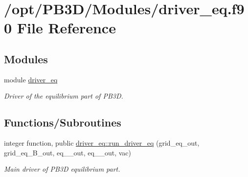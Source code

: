 \hypertarget{driver__eq_8f90}{}\section{/opt/\+P\+B3\+D/\+Modules/driver\+\_\+eq.f90 File Reference}
\label{driver__eq_8f90}
\subsection*{Modules}
\begin{DoxyCompactItemize}
\item 
module \hyperlink{namespacedriver__eq}{driver\+\_\+eq}
\begin{DoxyCompactList}\small\item\em Driver of the equilibrium part of P\+B3D. \end{DoxyCompactList}\end{DoxyCompactItemize}
\subsection*{Functions/\+Subroutines}
\begin{DoxyCompactItemize}
\item 
integer function, public \hyperlink{namespacedriver__eq_adc9d5dff288fa512e5ef885627d940cc}{driver\+\_\+eq\+::run\+\_\+driver\+\_\+eq} (grid\+\_\+eq\+\_\+out, grid\+\_\+eq\+\_\+\+B\+\_\+out, eq\+\_\+\_\+out, eq\+\_\+\_\+out, vac)
\begin{DoxyCompactList}\small\item\em Main driver of P\+B3D equilibrium part. \end{DoxyCompactList}\end{DoxyCompactItemize}
